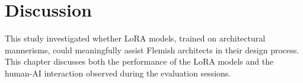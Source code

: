 \chapter{Discussion}
This study investigated whether LoRA models, trained on architectural mannerisms, could meaningfully assist Flemish architects in their design process. This chapter discusses both the performance of the LoRA models and the human-AI interaction observed during the evaluation sessions.



